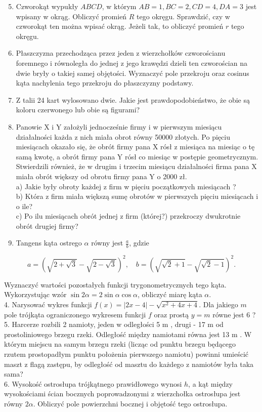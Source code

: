 \documentclass[10pt]{article}
\begin{document}
\begin{enumerate}
  \setcounter{enumi}{4}
  \item Czworokąt wypukły $A B C D$, w którym $A B=1, B C=2, C D=4, D A=3$ jest wpisany w okrąg. Obliczyć promień $R$ tego okręgu. Sprawdzić, czy w czworokąt ten można wpisać okrąg. Jeżeli tak, to obliczyć promień $r$ tego okręgu.
  \item Płaszczyzna przechodząca przez jeden z wierzchołków czworościanu foremnego i równoległa do jednej z jego krawędzi dzieli ten czworościan na dwie bryły o takiej samej objętości. Wyznaczyć pole przekroju oraz cosinus kąta nachylenia tego przekroju do płaszczyzny podstawy.
  \item Z talii 24 kart wylosowano dwie. Jakie jest prawdopodobieństwo, że obie są koloru czerwonego lub obie są figurami?
  \item Panowie X i Y założyli jednocześnie firmy i w pierwszym miesiącu działalności każda z nich miała obrot równy 50000 złotych. Po pięciu miesiącach okazało się, że obrót firmy pana X rósł z miesiąca na miesiąc o tę samą kwotę, a obrót firmy pana Y rósł co miesiąc w postępie geometrycznym. Stwierdzili również, że w drugim i trzecim miesiącu działalności firma pana X miała obrót większy od obrotu firmy pana Y o 2000 zł.\\
a) Jakie były obroty każdej z firm w pięciu początkowych miesiącach ?\\
b) Która z firm miała większą sumę obrotów w pierwszych pięciu miesiącach i o ile?\\
c) Po ilu miesiącach obrót jednej z firm (której?) przekroczy dwukrotnie obrót drugiej firmy?
  \item Tangens kąta ostrego $\alpha$ równy jest $\frac{a}{b}$, gdzie
\end{enumerate}

$$
a=(\sqrt{2+\sqrt{3}}-\sqrt{2-\sqrt{3}})^{2}, \quad b=(\sqrt{\sqrt{2}+1}-\sqrt{\sqrt{2}-1})^{2} .
$$

Wyznaczyć wartości pozostałych funkcji trygonometrycznych tego kąta. Wykorzystując wzór $\sin 2 \alpha=2 \sin \alpha \cos \alpha$, obliczyć miarę kąta $\alpha$.\\
4. Narysować wykres funkcji $f(x)=|2 x-4|-\sqrt{x^{2}+4 x+4}$. Dla jakiego $m$ pole trójkąta ograniczonego wykresem funkcji $f$ oraz prostą $y=m$ równe jest 6 ?\\
5. Harcerze rozbili 2 namioty, jeden w odległości 5 m , drugi - 17 m od prostoliniowego brzegu rzeki. Odległość między namiotami równa jest 13 m . W którym miejscu na samym brzegu rzeki (licząc od punktu brzegu będącego rzutem prostopadłym punktu położenia pierwszego namiotu) powinni umieścić maszt z flagą zastępu, by odległość od masztu do każdego z namiotów była taka sama?\\
6. Wysokość ostrosłupa trójkątnego prawidłowego wynosi $h$, a kąt między wysokościami ścian bocznych poprowadzonymi z wierzchołka ostrosłupa jest równy $2 \alpha$. Obliczyć pole powierzchni bocznej i objętość tego ostrosłupa.
\end{document}
